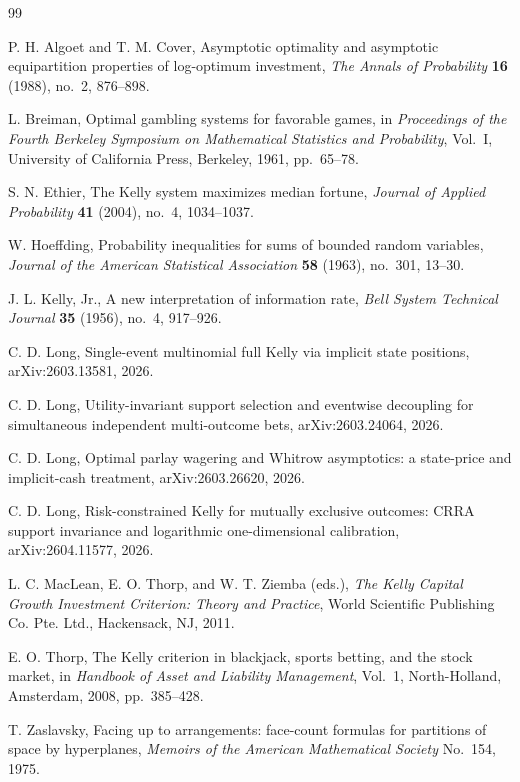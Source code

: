 \documentclass[11pt]{article}
\theoremstyle{definition}
\newcommand{\1}{\mathbf{1}}
\begin{document}
\begin{thebibliography}{99}

P. H. Algoet and T. M. Cover,
\newblock Asymptotic optimality and asymptotic equipartition properties of log-optimum investment,
\newblock \emph{The Annals of Probability} \textbf{16} (1988), no.~2, 876--898.

L. Breiman,
\newblock Optimal gambling systems for favorable games,
\newblock in \emph{Proceedings of the Fourth Berkeley Symposium on Mathematical Statistics and Probability}, Vol.~I, University of California Press, Berkeley, 1961, pp.~65--78.

S. N. Ethier,
\newblock The {K}elly system maximizes median fortune,
\newblock \emph{Journal of Applied Probability} \textbf{41} (2004), no.~4, 1034--1037.

W. Hoeffding,
\newblock Probability inequalities for sums of bounded random variables,
\newblock \emph{Journal of the American Statistical Association} \textbf{58} (1963), no.~301, 13--30.

J. L. Kelly, Jr.,
\newblock A new interpretation of information rate,
\newblock \emph{Bell System Technical Journal} \textbf{35} (1956), no.~4, 917--926.

C. D. Long,
\newblock Single-event multinomial full Kelly via implicit state positions,
\newblock arXiv:2603.13581, 2026.

C. D. Long,
\newblock Utility-invariant support selection and eventwise decoupling for simultaneous independent multi-outcome bets,
\newblock arXiv:2603.24064, 2026.

C. D. Long,
\newblock Optimal parlay wagering and Whitrow asymptotics: a state-price and implicit-cash treatment,
\newblock arXiv:2603.26620, 2026.

C. D. Long,
\newblock Risk-constrained Kelly for mutually exclusive outcomes: CRRA support invariance and logarithmic one-dimensional calibration,
\newblock arXiv:2604.11577, 2026.

L. C. MacLean, E. O. Thorp, and W. T. Ziemba (eds.),
\newblock \emph{The Kelly Capital Growth Investment Criterion: Theory and Practice},
\newblock World Scientific Publishing Co. Pte. Ltd., Hackensack, NJ, 2011.

E. O. Thorp,
\newblock The Kelly criterion in blackjack, sports betting, and the stock market,
\newblock in \emph{Handbook of Asset and Liability Management}, Vol.~1, North-Holland, Amsterdam, 2008, pp.~385--428.

T. Zaslavsky,
\newblock Facing up to arrangements: face-count formulas for partitions of space by hyperplanes,
\newblock \emph{Memoirs of the American Mathematical Society} No.~154, 1975.

\end{thebibliography}
\end{document}
